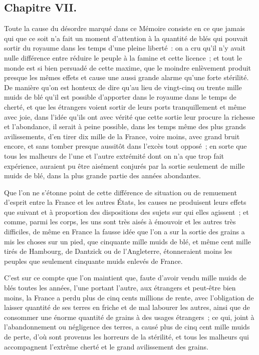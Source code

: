 \documentclass[french,twoside]{book} %
\begin{document}
\subsection[{Chapitre VII.}]{Chapitre VII.}
\noindent Toute la cause du désordre marqué dans ce Mémoire consiste en ce que jamais qui que ce soit n’a fait un moment d’attention à la quantité de blés qui pouvait sortir du royaume dans les temps d’une pleine liberté : on a cru qu’il n’y avait nulle différence entre réduire le peuple à la famine et cette licence ; et tout le monde est si bien persuadé de cette maxime, que le moindre enlèvement produit presque les mêmes effets et cause une aussi grande alarme qu’une forte stérilité. De manière qu’on est honteux de dire qu’au lieu de vingt-cinq ou trente mille muids de blé qu’il est possible d’apporter dans le royaume dans le temps de cherté, et que les étrangers voient sortir de leurs ports tranquillement et même avec joie, dans l’idée qu’ils ont avec vérité que cette sortie leur procure la richesse et l’abondance, il serait à peine possible, dans les temps même des plus grands avilissements, d’en tirer dix mille de la France, voire moins, avec grand bruit encore, et sans tomber presque aussitôt dans l’excès tout opposé ; en sorte que tous les malheurs de l’une et l’autre extrémité dont on n’a que trop fait expérience, auraient pu être aisément conjurés par la sortie seulement de mille muids de blé, dans la plus grande partie des années abondantes.\par
Que l’on ne s’étonne point de cette différence de situation ou de remuement d’esprit entre la France et les autres États, les causes ne produisent leurs effets que suivant et à proportion des dispositions des sujets sur qui elles agissent ; et comme, parmi les corps, les uns sont très aisés à émouvoir et les autres très difficiles, de même en France la fausse idée que l’on a sur la sortie des grains a mis les choses sur un pied, que cinquante mille muids de blé, et même cent mille tirés de Hambourg, de Dantzick ou de l’Angleterre, étonneraient moins les peuples que seulement cinquante muids enlevés de France.\par
C’est sur ce compte que l’on maintient que, faute d’avoir vendu mille muids de blés toutes les années, l’une portant l’autre, aux étrangers et peut-être bien moins, la France a perdu plus de cinq cents millions de rente, avec l’obligation de laisser quantité de ses terres en friche et de mal labourer les autres, ainsi que de consommer une énorme quantité de grains à des usages étrangers ; ce qui, joint à l’abandonnement ou négligence des terres, a causé plus de cinq cent mille muids de perte, d’où sont provenus les horreurs de la stérilité, et tous les malheurs qui accompagnent l’extrême cherté et le grand avilissement des grains.\par
\end{document}
